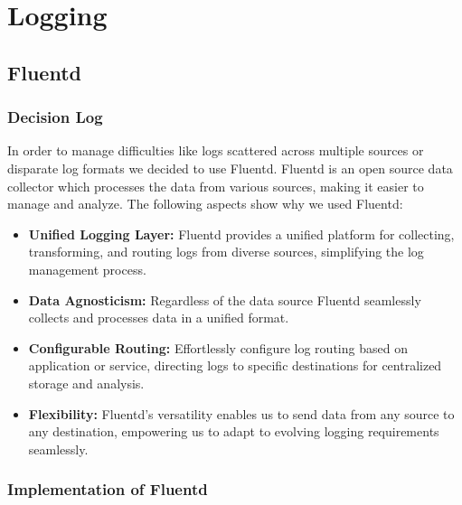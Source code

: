 \section{Logging}
\subsection{Fluentd}
\subsubsection{Decision Log}

In order to manage difficulties like logs scattered across multiple sources or disparate log formats we decided to use Fluentd. 
Fluentd is an open source data collector which processes the data from various sources, making it easier to manage and analyze. 
The following aspects show why we used Fluentd: 
\begin{itemize}
    \item \textbf{Unified Logging Layer:} Fluentd provides a unified platform for collecting, transforming, and routing logs from diverse sources, simplifying the log management process.
    \item \textbf{Data Agnosticism:} Regardless of the data source Fluentd seamlessly collects and processes data in a unified format.
    \item \textbf{Configurable Routing:} Effortlessly configure log routing based on application or service, directing logs to specific destinations for centralized storage and analysis.
    \item \textbf{Flexibility:} Fluentd's versatility enables us to send data from any source to any destination, empowering us to adapt to evolving logging requirements seamlessly.
\end{itemize}

\subsubsection{Implementation of Fluentd}

